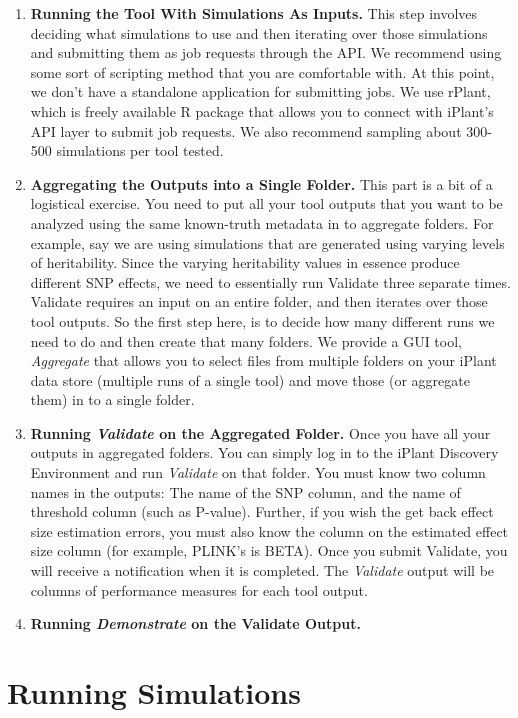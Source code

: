 \documentclass[twoside,a4paper]{refart}
\begin{document}
\begin{enumerate}
\item \textbf{Running the Tool With Simulations As Inputs.}
This step involves deciding what simulations to use and then iterating over those simulations and submitting them as job requests through the API. We recommend using some sort of scripting method that you are comfortable with. At this point, we don't have a standalone application for submitting jobs. We use rPlant, which is freely available R package that allows you to connect with iPlant's API layer to submit job requests. We also recommend sampling about 300-500 simulations per tool tested.
\item \textbf{Aggregating the Outputs into a Single Folder.}
This part is a bit of a logistical exercise. You need to put all your tool outputs that you want to be analyzed using the same known-truth metadata in to aggregate folders. For example, say we are using simulations that are generated using varying levels of heritability. Since the varying heritability values in essence produce different SNP effects, we need to essentially run Validate three separate times. Validate requires an input on an entire folder, and then iterates over those tool outputs. So the first step here, is to decide how many different runs we need to do and then create that many folders. We provide a GUI tool, \textit{Aggregate} that allows you to select files from multiple folders on your iPlant data store (multiple runs of a single tool) and move those (or aggregate them) in to a single folder.
\item \textbf{Running \textit{Validate} on the Aggregated Folder.}
Once you have all your outputs in aggregated folders. You can simply log in to the iPlant Discovery Environment and run \textit{Validate} on that folder. You must know two column names in the outputs: The name of the SNP column, and the name of threshold column (such as P-value). Further, if you wish the get back effect size estimation errors, you must also know the column on the estimated effect size column (for example, PLINK's is BETA). Once you submit Validate, you will receive a notification when it is completed. The \textit{Validate} output will be columns of performance measures for each tool output.
\item \textbf{Running \textit{Demonstrate} on the Validate Output.}
\end{enumerate}

\section{Running Simulations}
\end{document}
